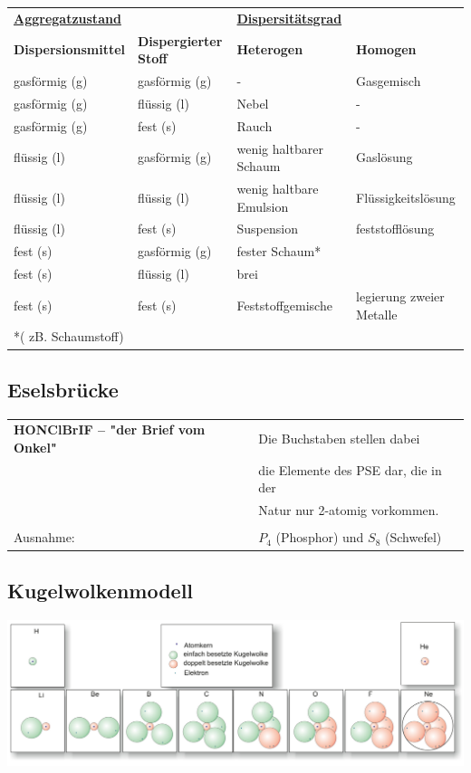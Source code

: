 {\footnotesize
	\begin{tabular}[\columnwidth]{l l | l l}
			\underline{\textbf{Aggregatzustand}} 	&     					& \underline{\textbf{Dispersitätsgrad}}    &   \\ 
			\textbf{Dispersionsmittel}  	& \textbf{Dispergierter Stoff}	& \textbf{Heterogen}   		& \textbf{Homogen}       \\
			gasförmig (g) 		& gasförmig (g)        	& -          		& Gasgemisch        \\
			gasförmig (g)		& flüssig (l)			& Nebel				& -		\\
			gasförmig (g)		& fest (s)				& Rauch				& -		\\
			flüssig (l)			& gasförmig (g) 		& wenig haltbarer Schaum	& Gaslösung		\\
			flüssig (l)			& flüssig (l) 			& wenig haltbare Emulsion				& Flüssigkeitslösung		\\
			flüssig (l)			& fest (s) 				& Suspension				& feststofflösung	\\
			fest (s)			& gasförmig (g) 		& fester Schaum* 			& 		\\
			fest (s)			& flüssig (l) 			& brei				&		\\
			fest (s)			& fest (s) 				& Feststoffgemische				& legierung zweier Metalle	\\
			*( zB. Schaumstoff) 	&				&						& \\
	\end{tabular} 
}
		
\subsection{Eselsbrücke}

\begin{tabular}{ll} 
	\textbf{HONClBrIF – "der Brief vom Onkel"}   &  Die Buchstaben stellen dabei \\
	& die Elemente des PSE dar, die in der \\
	& Natur nur 2-atomig vorkommen. \\ & \\
	Ausnahme: & $P_4$ (Phosphor) und $S_8$ (Schwefel)  \\
\end{tabular}
\renewcommand{\arraystretch}{1}  

\subsection{Kugelwolkenmodell}	
\begin{center}
	\includegraphics[width=\columnwidth]{images/kugelwolkenmodell.jpg}
\end{center}

